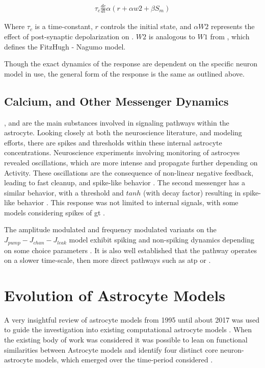     \begin{align}
      \tau_c \frac{dc}{dt} \alpha (r + \alpha w2 + \beta S_m) \label{eq:kp_path_fn}
    \end{align}

    Where $\tau_c$ is a time-constant, $r$ controls the initial state, and
    $\alpha W2$ represents the effect of post-synaptic depolarization on
    \ca. $W2$ is analogous to $W1$ from , which
    defines the FitzHugh - Nagumo model.

    Though the exact dynamics of the response are dependent on the specific
    neuron model in use, the general form of the response is the same as
    outlined above.
    
    \subsection{Calcium, and Other Messenger Dynamics}
    \ca, \ipt and \kp are the main substances involved in signaling pathways
    within the astrocyte. Looking closely at both the neuroscience literature,
    and modeling efforts, there are spikes and thresholds within these internal
    astrocyte concentrations. Neuroscience experiments involving monitoring of
    astrocyes revealed oscillations, which are more intense and propagate
    further depending on Activity. These oscillations are the consequence of
    non-linear negative feedback, leading to fast cleanup, and spike-like
    behavior \parencite{postnov_2009}. The second messenger \ipt has a similar
    behavior, with a threshold and $tanh$ (with decay factor) resulting in
    spike-like behavior \parencite{postnov_2009}. This response was not limited
    to internal signals, with some models considering spikes of \gls{gt}
    \parencite{wade_2011}.

    The amplitude modulated and frequency modulated variants on the $J_{pump} -
    J_{chan} - J_{leak}$ model exhibit spiking and non-spiking \ca dynamics depending on some choice
    parameters \parencite{pitta_2009,wade_2011}. It is also well established
    that the \ipt pathway operates on a slower time-scale, then more direct
    pathways such as \gls{atp} or \kp \parencite{postnov_2009, bassam_2015}.

    \section{Evolution of Astrocyte Models}
    A very insightful review of astrocyte models from 1995 until about 2017 was
    used to guide the investigation into existing computational astrocyte models
    \parencite{manninen_2018}. When the existing body of work was considered it
    was possible to lean on functional similarities between Astrocyte models and
    identify four distinct core neuron-astrocyte models, which emerged over the
    time-period considered \parencite{manninen_2018}.

